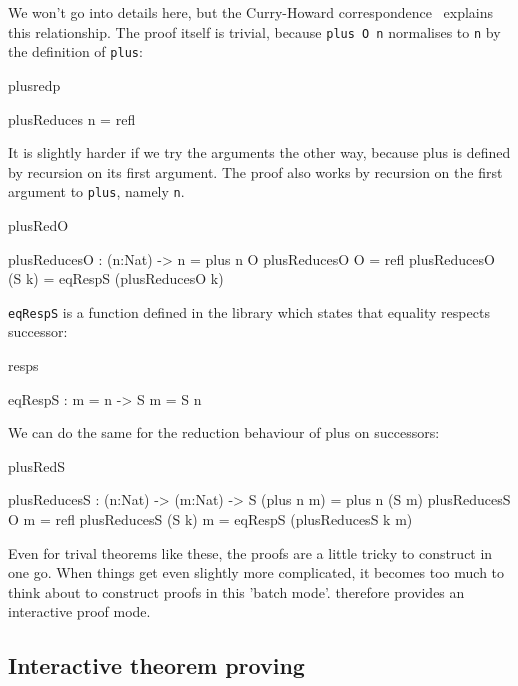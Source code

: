 We won't go into details here, but the Curry-Howard
correspondence~\cite{howard} explains this relationship.
The proof itself is trivial, because \texttt{plus O n} normalises to \texttt{n} 
by the definition of \texttt{plus}:

\begin{SaveVerbatim}{plusredp}

plusReduces n = refl

\end{SaveVerbatim}

\noindent
It is slightly harder if we try the arguments the other way, because plus is
defined by recursion on its first argument. The proof also works by recursion
on the first argument to \texttt{plus}, namely \texttt{n}.

\begin{SaveVerbatim}{plusRedO}

plusReducesO : (n:Nat) -> n = plus n O
plusReducesO O = refl
plusReducesO (S k) = eqRespS (plusReducesO k)

\end{SaveVerbatim}

\noindent
\texttt{eqRespS} is a function defined in the library which states that
equality respects successor:

\begin{SaveVerbatim}{resps}

eqRespS : m = n -> S m = S n

\end{SaveVerbatim}

\noindent
We can do the same for the reduction behaviour of plus on successors:

\begin{SaveVerbatim}{plusRedS}

plusReducesS : (n:Nat) -> (m:Nat) -> S (plus n m) = plus n (S m)
plusReducesS O m = refl
plusReducesS (S k) m = eqRespS (plusReducesS k m)

\end{SaveVerbatim}

\noindent
Even for trival theorems like these, the proofs are a little tricky to
construct in one go. When things get even slightly more complicated, it becomes
too much to think about to construct proofs in this 'batch mode'. \Idris{}
therefore provides an interactive proof mode.

\subsection{Interactive theorem proving}

